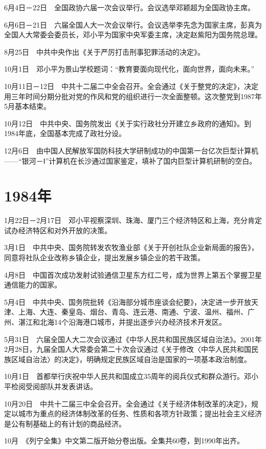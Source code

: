 \documentclass[10pt,a4paper,twocolumn]{book}
\begin{document}
6月4日－22日　全国政协六届一次会议举行。会议选举邓颖超为全国政协主席。

6月6日－21日　六届全国人大一次会议举行。会议选举李先念为国家主席，彭真为全国人大常委会委员长，邓小平为国家中央军委主席，决定赵紫阳为国务院总理。

8月25日　中共中央作出《关于严厉打击刑事犯罪活动的决定》。

10月1日　邓小平为景山学校题词：“教育要面向现代化，面向世界，面向未来。”

10月11日－12日　中共十二届二中全会召开。全会通过《关于整党的决定》，决定用三年时间分期分批对党的作风和党的组织进行一次全面整顿。这次整党到1987年5月基本结束。

10月12日　中共中央、国务院发出《关于实行政社分开建立乡政府的通知》。到1984年底，全国基本完成了政社分设。

12月6日　由中国人民解放军国防科技大学研制成功的中国第一台亿次巨型计算机——“银河－Ⅰ”计算机在长沙通过国家鉴定，填补了国内巨型计算机研制的空白。

\section{1984年}

1月22日－2月17日　邓小平视察深圳、珠海、厦门三个经济特区和上海，充分肯定试办经济特区和对外开放的决策。

3月1日　中共中央、国务院转发农牧渔业部《关于开创社队企业新局面的报告》，同意将社队企业改称乡镇企业，提出发展乡镇企业的若干政策。

4月8日　中国首次成功发射试验通信卫星东方红二号，成为世界上第五个掌握卫星通信能力的国家。

5月4日　中共中央、国务院批转《沿海部分城市座谈会纪要》，决定进一步开放天津、上海、大连、秦皇岛、烟台、青岛、连云港、南通、宁波、温州、福州、广州、湛江和北海14个沿海港口城市，并提出逐步兴办经济技术开发区。

5月31日　六届全国人大二次会议通过《中华人民共和国民族区域自治法》。2001年2月28日，九届全国人大常委会第二十次会议通过《关于修改〈中华人民共和国民族区域自治法〉的决定》，明确规定民族区域自治是国家的一项基本政治制度。

10月1日　首都举行庆祝中华人民共和国成立35周年的阅兵仪式和群众游行。邓小平检阅受阅部队并发表讲话。

10月20日　中共十二届三中全会召开。全会通过《关于经济体制改革的决定》，规定以城市为重点的经济体制改革的任务、性质和各项方针政策；提出社会主义经济是公有制基础上的有计划的商品经济。

10月　《列宁全集》中文第二版开始分卷出版。全集共60卷，到1990年出齐。
\end{document}
